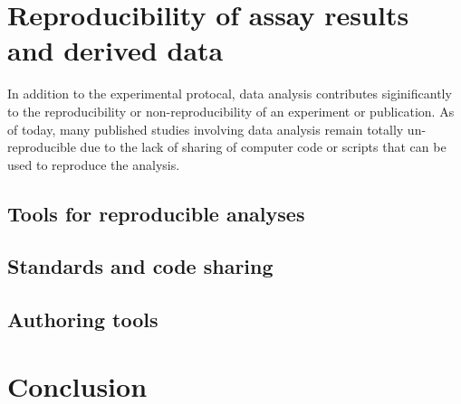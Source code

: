 \documentclass[11pt]{article}\usepackage{graphicx, color}
\begin{document}
\section{Reproducibility of assay results and derived data}
In addition to the experimental protocal, data analysis contributes siginificantly to the reproducibility or non-reproducibility of an experiment or publication. As of today, many published studies involving data analysis remain totally un-reproducible due to the lack of 
sharing of computer code or scripts that can be used to reproduce the analysis. 

\subsection{Tools for reproducible analyses}
\subsection{Standards and code sharing}
\subsection{Authoring tools}

\section{Conclusion}
\end{document}

